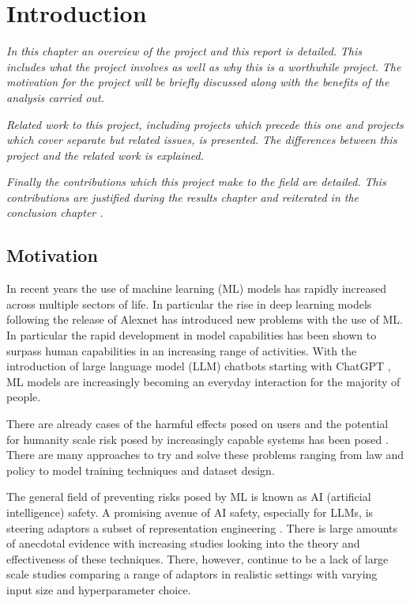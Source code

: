\chapter{Introduction}
\label{ch:introduction}

\emph{In this chapter an overview of the project and this report is detailed.}
\emph{This includes what the project involves as well as why this is a worthwhile project.}
\emph{The motivation for the project will be briefly discussed along with the benefits of the analysis carried out.}

\emph{Related work to this project, including projects which precede this one and projects which cover separate but related issues, is presented.}
\emph{The differences between this project and the related work is explained.}

\emph{Finally the contributions which this project make to the field are detailed.}
\emph{This contributions are justified during the results chapter  and reiterated in the conclusion chapter .}

\section{Motivation}

In recent years the use of machine learning (ML) models has rapidly increased across multiple sectors of life.
In particular the rise in deep learning models following the release of Alexnet \citep{alexnet} has introduced new problems with the use of ML.
In particular the rapid development in model capabilities \citep{dynabench, gpt-5, grok-4, hle} has been shown to surpass human capabilities in an increasing range of activities.
With the introduction of large language model (LLM) chatbots starting with ChatGPT \citep{chatgpt}, ML models are increasingly becoming an everyday interaction for the majority of people.

There are already cases of the harmful effects posed on users \citep{c.ai, psychosis} and the potential for humanity scale risk posed by increasingly capable systems has been posed \citep{survellience, deepfakes, disempowerment}.
There are many approaches to try and solve these problems ranging from law and policy to model training techniques and dataset design.

The general field of preventing risks posed by ML is known as AI (artificial intelligence) safety.
A promising avenue of AI safety, especially for LLMs, is steering adaptors a subset of representation engineering \citep{steering-taxonomy}.
There is large amounts of anecdotal evidence with increasing studies looking into the theory \citep{steering-clear, steering-theory} and effectiveness \citep{steerability, steering-taxonomy} of these techniques.
There, however, continue to be a lack of large scale studies comparing a range of adaptors in realistic settings with varying input size and hyperparameter choice.


